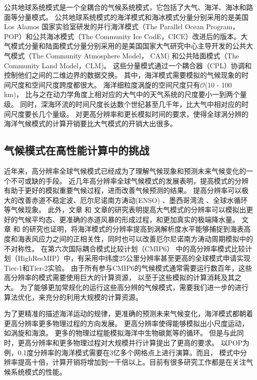 公共地球系统模式是一个全耦合的气候系统模式，它包括了大气、海洋、海冰和路面等分量模式。
公共地球系统模式的海洋模式和海冰模式分量分别采用的是美国Los Alamos 国家实验室研发的并行海洋模式（The Parallel Ocean Program，POP）和公共海冰模式（The Community Ice CodE，CICE）改进后的版本。大气模式分量和陆面模式分量分别采用的是美国国家大气研究中心主导开发的公共大气模式（The Community Atmosphere Model， CAM) 和公共陆面模式（The Community Land Model，CLM)。 这些分量模式通过一个耦合器（CPL）协调和控制他们之间的二维边界的数据交换。
其中，海洋模式需要模拟的气候现象的时间尺度和空间尺度跨度都很大。 
海洋细粒度涡旋的空间尺度只有$\mathcal{O}$(10 - 100 km)， 比与之在动力学角度上相对应的大气中的天气系统的尺度要小一到两个量级。
同时，深海环流的时间尺度长达数个世纪甚至几千年，比大气中相对应的时间尺度要长几个量级。
对更高分辨率和更长模拟时间的要求，使得全球涡分辨的海洋气候模式的计算开销要比大气模式的开销大出很多\cite{bryan2010frontal,mcclean2011prototype,graham2014importance}。
 


 

\subsection{气候模式在高性能计算中的挑战}

近年来，高分辨率全球气候模式已经成为了理解气候现象和预测未来气候变化的一个不可或缺的手段。
近几年高分辨率全球气候模式的发展表明，提高模式的分辨有助于更好的模拟重要气候过程，进而改善气候预测的结果。
提高分辨率可以极大的改善赤道不稳定波\citep{roberts2009impact}、厄尔尼诺南方涛动(ENSO) \citep{shaffrey2009uk}、墨西哥湾流\citep{chassignet2008gulf, kuwano2010precipitation} 、全球水循环\citep{demory2014role}等气候现象。
此外，文章 和 文章的研究表明提高大气模式的分辨率可以模拟出更好的气候平均态、更准确的赤道风暴的形成过程，和更加真实的极端降水量。
文章 和 的研究也证明，将海洋模式的分辨率提高到涡解析度水平能够捕捉到海表高度和海表风应力之间的正相关性，同时也可以改善厄尔尼诺南方涛动周期模拟中的不对称性。
在第六次国际耦合模式比较计划（CMIP6） 中的高分辨率模式比较计划（HighResMIP）中，有采用中纬度25公里分辨率甚至更高的全球模式申请实现Tier-1和Tier-2实验。 
由于所有参与CMIP6的气候模式通常需要运行数百年，这些高分辨率的模式需要使用巨大的计算资源， 以至于这些模拟的计算消耗及其之大。
为了能够更加常规化的运行这些高分辨的气候模式，需要我们进一步的进行算法优化，来充分的利用大规模的计算资源。

为了更精准的描述海洋运动的规律，更准确的预测未来气候变化，海洋模式都朝着更高分辨率更多物理过程的方向发展。
更高分辨率使得能够模拟出小尺度运动，如涡旋和海浪。 更多的物理过程能模拟海洋中生物碳氮等的循环。
但是与此同时，更高分辨率和更多物理过程对大规模并行计算提出了更高的要求。
以POP为例，0.1度分辨率的海洋模式需要在3亿多个网格点上进行演算。而且，
模式中分辨率提高十倍，计算开销将增加到一千倍以上。目前有很多研究工作都是在关注气候系统模式的性能\cite{Worley:2011:PCE:2063384.2063457,dennis2012computational}。 

